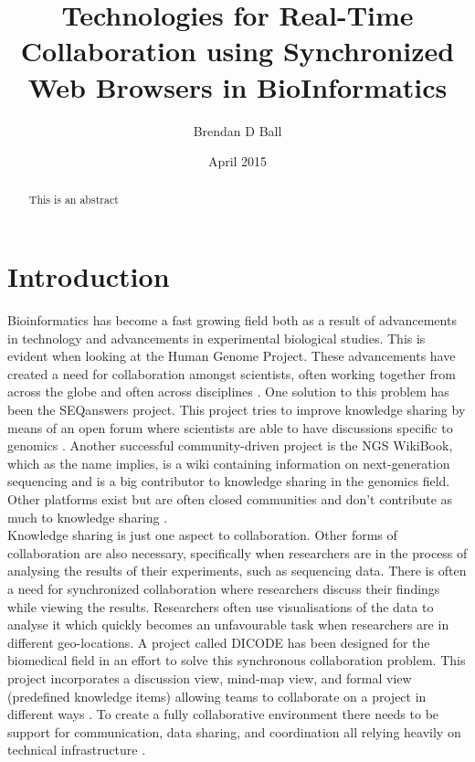 \documentclass[prodmode,acmtecs]{acmsmall}
\begin{document}

\title{Technologies for Real-Time Collaboration using Synchronized Web Browsers in BioInformatics} %
\author{Brendan D Ball
}
\date{April 2015}

\begin{abstract}
This is an abstract
\end{abstract}

\maketitle
\section{Introduction}

Bioinformatics has become a fast growing field both as a result of advancements in technology and advancements in experimental biological studies. This is evident when looking at the Human Genome Project. These advancements have created a need for collaboration amongst scientists, often working together from across the globe and often across disciplines \cite{li2013ngs,lee2007facilitating,tsiliki2014datamining}. One solution to this problem has been the SEQanswers project. This project tries to improve knowledge sharing by means of an open forum where scientists are able to have discussions specific to genomics \cite{li2012seqanswers}. Another successful community-driven project is the NGS WikiBook, which as the name implies, is a wiki containing information on next-generation sequencing and is a big contributor to knowledge sharing in the genomics field. Other platforms exist but are often closed communities and don't contribute as much to knowledge sharing \cite{li2013ngs}.\\

Knowledge sharing is just one aspect to collaboration. Other forms of collaboration are also necessary, specifically when researchers are in the process of analysing the results of their experiments, such as sequencing data. There is often a need for synchronized collaboration where researchers discuss their findings while viewing the results. Researchers often use visualisations of the data to analyse it which quickly becomes an unfavourable task when researchers are in different geo-locations. A project called DICODE has been designed for the biomedical field in an effort to solve this synchronous collaboration problem. This project incorporates a discussion view, mind-map view, and formal view (predefined knowledge items) allowing teams to collaborate on a project in different ways \cite{karacapilidis2011facilitating}. To create a fully collaborative environment there needs to be support for communication, data sharing, and coordination all relying heavily on technical infrastructure \cite{lee2007facilitating}.\\
\end{document}
